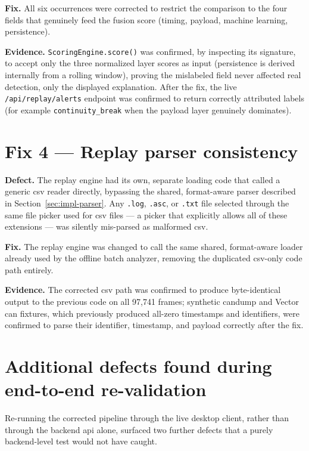 \textbf{Fix.} All six occurrences were corrected to restrict the comparison to the four fields that genuinely feed the fusion score (timing, payload, machine learning, persistence).

\textbf{Evidence.} \texttt{ScoringEngine.score()} was confirmed, by inspecting its signature, to accept only the three normalized layer scores as input (persistence is derived internally from a rolling window), proving the mislabeled field never affected real detection, only the displayed explanation. After the fix, the live \texttt{/api/replay/alerts} endpoint was confirmed to return correctly attributed labels (for example \texttt{continuity\_break} when the payload layer genuinely dominates).

\section{Fix 4 — Replay parser consistency}

\textbf{Defect.} The replay engine had its own, separate loading code that called a generic \gls{csv} reader directly, bypassing the shared, format-aware parser described in Section~\ref{sec:impl-parser}. Any \texttt{.log}, \texttt{.asc}, or \texttt{.txt} file selected through the same file picker used for \gls{csv} files — a picker that explicitly allows all of these extensions — was silently mis-parsed as malformed \gls{csv}.

\textbf{Fix.} The replay engine was changed to call the same shared, format-aware loader already used by the offline batch analyzer, removing the duplicated \gls{csv}-only code path entirely.

\textbf{Evidence.} The corrected \gls{csv} path was confirmed to produce byte-identical output to the previous code on all 97{,}741 frames; synthetic candump and Vector \gls{can} fixtures, which previously produced all-zero timestamps and identifiers, were confirmed to parse their identifier, timestamp, and payload correctly after the fix.

\section{Additional defects found during end-to-end re-validation}

Re-running the corrected pipeline through the live desktop client, rather than through the backend \gls{api} alone, surfaced two further defects that a purely backend-level test would not have caught.

